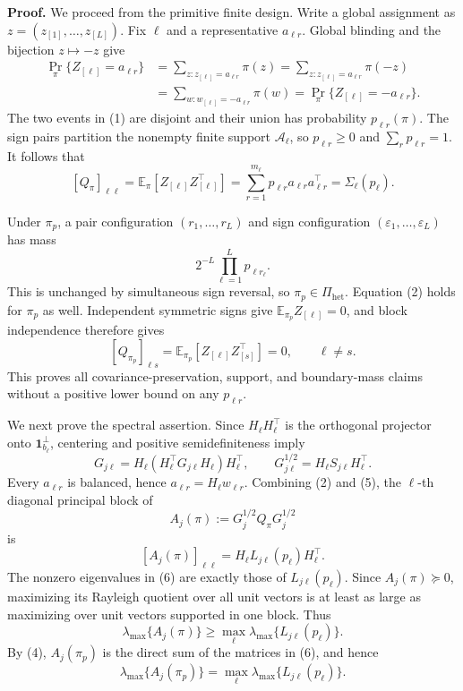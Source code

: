 \textbf{Proof.}
We proceed from the primitive finite design.  Write a global assignment as \(z=(z_{[1]},\ldots,z_{[L]})\).  Fix \(\ell\) and a representative \(a_{\ell r}\).  Global blinding and the bijection \(z\mapsto-z\) give
\[
\begin{aligned}
\Pr_\pi\{Z_{[\ell]}=a_{\ell r}\}
&=\sum_{z:z_{[\ell]}=a_{\ell r}}\pi(z)
=\sum_{z:z_{[\ell]}=a_{\ell r}}\pi(-z)\\
&=\sum_{w:w_{[\ell]}=-a_{\ell r}}\pi(w)
=\Pr_\pi\{Z_{[\ell]}=-a_{\ell r}\}.
\end{aligned}
\tag{1}
\]
The two events in (1) are disjoint and their union has probability \(p_{\ell r}(\pi)\).  The sign pairs partition the nonempty finite support \(\mathcal A_\ell\), so \(p_{\ell r}\ge0\) and \(\sum_rp_{\ell r}=1\).  It follows that
\[
[Q_\pi]_{\ell\ell}
=\mathbb E_\pi[Z_{[\ell]}Z_{[\ell]}^\top]
=\sum_{r=1}^{m_\ell}p_{\ell r}a_{\ell r}a_{\ell r}^\top
=\Sigma_\ell(p_\ell).
\tag{2}
\]

Under \(\pi_p\), a pair configuration \((r_1,\ldots,r_L)\) and sign configuration \((\varepsilon_1,\ldots,\varepsilon_L)\) has mass
\[
2^{-L}\prod_{\ell=1}^Lp_{\ell r_\ell}.
\tag{3}
\]
This is unchanged by simultaneous sign reversal, so \(\pi_p\in\Pi_{\mathrm{het}}\).  Equation (2) holds for \(\pi_p\) as well.  Independent symmetric signs give \(\mathbb E_{\pi_p}Z_{[\ell]}=0\), and block independence therefore gives
\[
[Q_{\pi_p}]_{\ell s}
=\mathbb E_{\pi_p}[Z_{[\ell]}Z_{[s]}^\top]=0,
\qquad \ell\ne s.
\tag{4}
\]
This proves all covariance-preservation, support, and boundary-mass claims without a positive lower bound on any \(p_{\ell r}\).

We next prove the spectral assertion.  Since \(H_\ell H_\ell^\top\) is the orthogonal projector onto \(\mathbf1_{b_\ell}^\perp\), centering and positive semidefiniteness imply
\[
G_{j\ell}=H_\ell(H_\ell^\top G_{j\ell}H_\ell)H_\ell^\top,
\qquad
G_{j\ell}^{1/2}=H_\ell S_{j\ell}H_\ell^\top.
\tag{5}
\]
Every \(a_{\ell r}\) is balanced, hence \(a_{\ell r}=H_\ell w_{\ell r}\).  Combining (2) and (5), the \(\ell\)-th diagonal principal block of
\[
A_j(\pi):=G_j^{1/2}Q_\pi G_j^{1/2}
\]
is
\[
[A_j(\pi)]_{\ell\ell}
=H_\ell L_{j\ell}(p_\ell)H_\ell^\top.
\tag{6}
\]
The nonzero eigenvalues in (6) are exactly those of \(L_{j\ell}(p_\ell)\).  Since \(A_j(\pi)\succeq0\), maximizing its Rayleigh quotient over all unit vectors is at least as large as maximizing over unit vectors supported in one block.  Thus
\[
\lambda_{\max}\{A_j(\pi)\}
\ge\max_\ell\lambda_{\max}\{L_{j\ell}(p_\ell)\}.
\tag{7}
\]
By (4), \(A_j(\pi_p)\) is the direct sum of the matrices in (6), and hence
\[
\lambda_{\max}\{A_j(\pi_p)\}
=\max_\ell\lambda_{\max}\{L_{j\ell}(p_\ell)\}.
\tag{8}
\]

